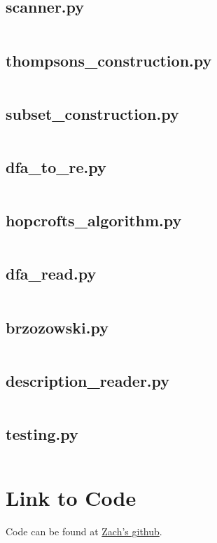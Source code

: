 \documentclass{article}
\begin{document}
\subsection{scanner.py}
\label{code:scanner}
\inputminted{python}{./scanner.py}

\subsection{thompsons\_construction.py}
\label{code:thompsons}
\inputminted{python}{./thompsons_construction.py}

\subsection{subset\_construction.py}
\label{code:subset}
\inputminted{python}{./subset_construction.py}

\subsection{dfa\_to\_re.py}
\label{code:dfaToRe}
\inputminted{python}{./dfa_to_re.py}

\subsection{hopcrofts\_algorithm.py}
\label{code:hopcrofts}
\inputminted{python}{./hopcrofts_algorithm.py}

\subsection{dfa\_read.py}
\label{code:dfaRead}
\inputminted{python}{./dfa_read.py}

\subsection{brzozowski.py}
\label{code:brzo}
\inputminted{python}{./brzozowski.py}

\subsection{description\_reader.py}
\label{code:descriptionReader}
\inputminted{python}{./description_reader.py}

\subsection{testing.py}
\label{code:testing}
\inputminted{python}{./testing.py}

\section{Link to Code}
Code can be found at \href{https://github.com/zinfidel/cs554-project1}{Zach's github}.
\end{document}

